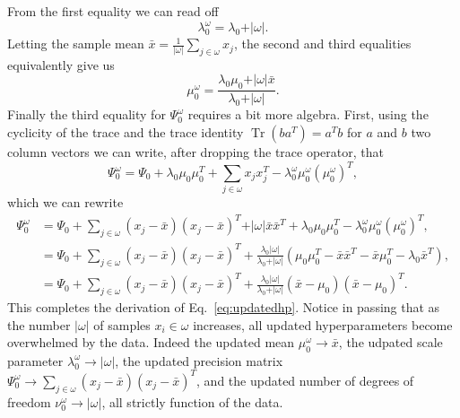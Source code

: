 \documentclass[11pt, oneside]{article}   	%
\DeclareMathOperator{\Tr}{Tr}
\begin{document}
From the first equality we can read off
$$\lambda_0^\omega = \lambda_0 + \vert\omega\vert.$$
Letting the sample mean $\bar x = \frac{1}{\vert\omega\vert}\sum_{j\in\omega}x_j$, the second and third equalities equivalently give us
$$\mu_0^\omega = \frac{\lambda_0\mu_0 + \vert\omega\vert\bar x}{\lambda_0 + \vert\omega\vert}.$$
Finally the third equality for $\Psi_0^\omega$ requires a bit more algebra. First, using the cyclicity of the trace and the trace identity $\Tr(b a^T) = a^T b$ for $a$ and $b$ two column vectors we can write, after dropping the trace operator, that
\begin{equation}
\Psi_0^\omega = \Psi_0 + \lambda_0\mu_0\mu_0^T + \sum_{j\in\omega} x_j x_j^T - \lambda_0^\omega\mu_0^\omega(\mu_0^\omega)^T,
\end{equation}
which we can rewrite
\begin{equation}\begin{split}
\Psi_0^\omega &= \Psi_0 + \sum_{j\in\omega}(x_j  - \bar x) (x_j - \bar x)^T + \vert\omega\vert\bar x\bar x^T + \lambda_0\mu_0\mu_0^T -\lambda_0^\omega \mu_0^\omega(\mu_0^\omega)^T,\\
&= \Psi_0 + \sum_{j\in\omega}(x_j  - \bar x) (x_j - \bar x)^T + \frac{\lambda_0 \vert\omega\vert}{\lambda_0 + \vert\omega\vert}\left(\mu_0\mu_0^T - \bar x\bar x^T - \bar x\mu_0^T - \lambda_0 \bar x^T\right),\\
&= \Psi_0 +  \sum_{j\in\omega}(x_j  - \bar x) (x_j - \bar x)^T + \frac{\lambda_0 \vert\omega\vert}{\lambda_0 + \vert\omega\vert}(\bar x - \mu_0)(\bar x - \mu_0)^T.
\end{split}\end{equation}
This completes the derivation of Eq.~\ref{eq:updatedhp}. Notice in passing that as the number $\vert\omega\vert$ of samples $x_i\in\omega$ increases, all updated hyperparameters become overwhelmed by the data. Indeed the updated mean $\mu_0^\omega \rightarrow \bar x$, the udpated scale parameter $\lambda_0^\omega \rightarrow \vert\omega\vert$, the updated precision matrix $\Psi_0^\omega\rightarrow \sum_{j\in\omega}(x_j - \bar x)(x_j - \bar x)^T$, and the updated number of degrees of freedom $\nu_0^\omega \rightarrow \vert\omega\vert$, all strictly function of the data.
\end{document}
